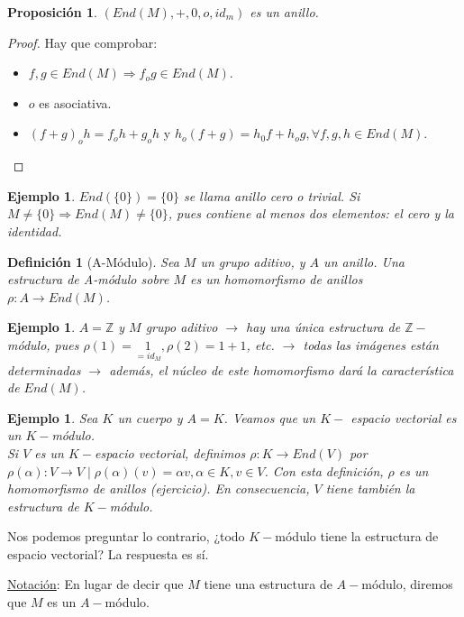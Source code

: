 \documentclass[11pt,a4paper]{article}
\theoremstyle{break}
\newtheorem{example}[theorem]{Ejemplo}
\newtheorem{definition}[theorem]{Definición}
\newtheorem{proposition}[theorem]{Proposición}
\begin{document}
\begin{proposition}
$(End(M), +, 0, {\scriptstyle o}, id_{m})$ es un anillo.
\end{proposition}

\begin{proof}
Hay que comprobar:
\begin{itemize}
\item $f, g \in End(M) \Rightarrow f_{o}g \in End(M)$.
\item ${\scriptstyle o}$ es asociativa.
\item $(f + g)_{o}h = f_{o}h + g_{o}h$ y $h_{o}(f+g) = h_{0}f + h_{o}g, \forall f, g, h \in End(M)$.
\end{itemize}
\end{proof}

\begin{example}
$End(\{0\}) = \{0\}$ se llama anillo cero o trivial. Si $M \neq \{0\} \Rightarrow End(M) \neq \{0\}$, pues contiene al menos dos elementos: el cero y la identidad.
\end{example}

\begin{definition}[A-Módulo]
Sea $M$ un grupo aditivo, y $A$ un anillo. Una estructura de A-módulo sobre $M$ es un homomorfismo de anillos $\rho: A \to End(M)$.
\end{definition}

\begin{example}
$A = \mathbb{Z}$ y $M$ grupo aditivo $\rightarrow$ hay una única estructura de $\mathbb{Z}-$módulo, pues $\rho(1) = \underset{=id_{M}}{1}, \rho(2) = 1 + 1$, etc. $\rightarrow$ todas las imágenes están determinadas $\rightarrow$ además, el núcleo de este homomorfismo dará la característica de $End(M)$.
\end{example}

\begin{example}
Sea $K$ un cuerpo y $A=K$. Veamos que un $K-$ espacio vectorial es un $K-$módulo. \\
Si $V$ es un $K-$espacio vectorial, definimos $\rho: K \to End(V)$ por $\rho(\alpha): V \to V \mid \rho(\alpha)(v) = \alpha v, \alpha \in K, v \in V$. Con esta definición, $\rho$ es un homomorfismo de anillos (ejercicio). En consecuencia, $V$ tiene también la estructura de $K-$módulo.
\end{example}

Nos podemos preguntar lo contrario, ¿todo $K-$módulo tiene la estructura de espacio vectorial? La respuesta es sí.

\underline{Notación}: En lugar de decir que $M$ tiene una estructura de $A-$módulo, diremos que $M$ es un $A-$módulo.
\end{document}

